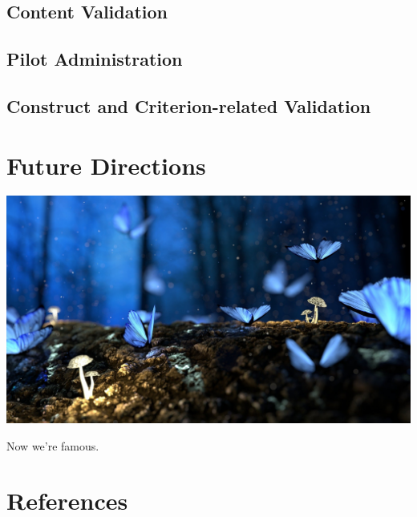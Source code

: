 \documentclass[
]{book}
\newlength{\cslhangindent}
\newlength{\cslentryspacingunit} %
\newenvironment{CSLReferences}[2] %
 {%
  \setlength{\parindent}{0pt}
  \ifodd #1
  \let\oldpar\par
  \def\par{\hangindent=\cslhangindent\oldpar}
  \fi
  \setlength{\parskip}{#2\cslentryspacingunit}
 }%
 {}
\begin{document}
\hypertarget{content-validation}{%
\section{Content Validation}\label{content-validation}}

\hypertarget{pilot-administration}{%
\section{Pilot Administration}\label{pilot-administration}}

\hypertarget{construct-and-criterion-related-validation}{%
\section{Construct and Criterion-related Validation}\label{construct-and-criterion-related-validation}}

\hypertarget{future-directions}{%
\chapter{Future Directions}\label{future-directions}}

\includegraphics{fantasy-g653fba516_1920.jpg}

Now we're famous.

\hypertarget{references}{%
\chapter{References}\label{references}}

\hypertarget{refs}{}
\begin{CSLReferences}{0}{0}
\end{CSLReferences}

\hypertarget{appendix-appendices}{%
\appendix}
\end{document}
